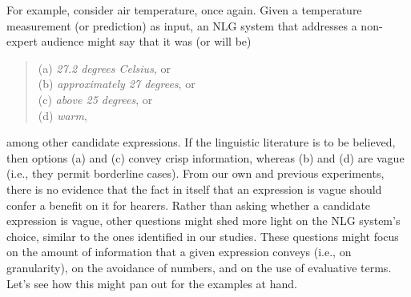 \documentclass[%
man,		%
floatsintext,%
apacite%
]{apa6}
\begin{document}
For example, consider air temperature, once again. Given a temperature measurement (or prediction) as input, an NLG system that addresses a non-expert audience might say that it was (or will be)
%
\begin{quote}
(a) {\em 27.2 degrees Celsius}, or\\
(b) {\em approximately 27 degrees}, or\\
(c) {\em above 25 degrees}, or\\
(d) {\em warm}, 
\end{quote}
%
among other candidate expressions. If the linguistic literature is to be believed, then options (a) and (c) convey crisp information, whereas (b) and (d) are vague (i.e., they permit borderline cases). From our own and previous experiments, there is no evidence that the fact in itself that an expression is vague should confer a benefit on it for hearers. Rather than asking whether a candidate expression is vague, other questions might shed more light on the NLG system's choice, similar to the ones identified in our studies. These questions might focus on the amount of information that a given expression conveys (i.e., on granularity), on the avoidance of numbers, and on the use of evaluative terms. Let's see how this might pan out for the examples at hand.
\end{document}
